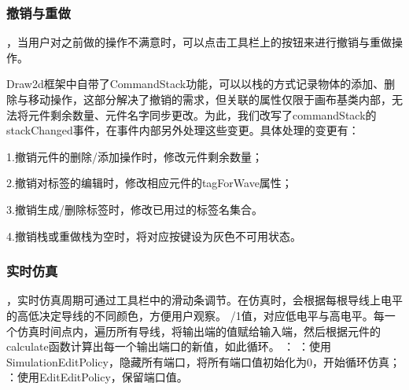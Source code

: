 \documentclass{article}
\begin{document}
\begin{CJK}{UTF8}{gbsn}
\subsubsection{撤销与重做}
    ，当用户对之前做的操作不满意时，可以点击工具栏上的按钮来进行撤销与重做操作。
    \par Draw2d框架中自带了CommandStack功能，可以以栈的方式记录物体的添加、删除与移动操作，这部分解决了撤销的需求，但关联的属性仅限于画布基类内部，无法将元件剩余数量、元件名字同步更改。为此，我们改写了commandStack的stackChanged事件，在事件内部另外处理这些变更。具体处理的变更有：
    \par1.撤销元件的删除/添加操作时，修改元件剩余数量；
    \par2.撤销对标签的编辑时，修改相应元件的tagForWave属性；
    \par3.撤销生成/删除标签时，修改已用过的标签名集合。
    \par4.撤销栈或重做栈为空时，将对应按键设为灰色不可用状态。

\subsubsection{实时仿真}
    ，实时仿真周期可通过工具栏中的滑动条调节。在仿真时，会根据每根导线上电平的高低决定导线的不同颜色，方便用户观察。
    /1值，对应低电平与高电平。每一个仿真时间点内，遍历所有导线，将输出端的值赋给输入端，然后根据元件的calculate函数计算出每一个输出端口的新值，如此循环。
    ：
    ：使用SimulationEditPolicy，隐藏所有端口，将所有端口值初始化为0，开始循环仿真；
    ：使用EditEditPolicy，保留端口值。


\end{CJK}
\end{document}
